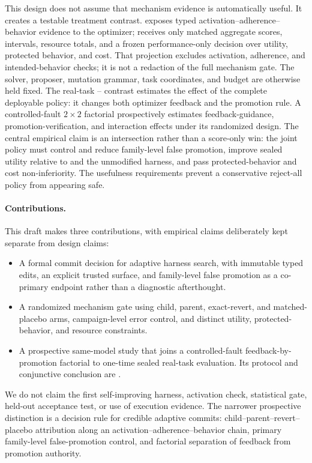 This design does not assume that mechanism evidence is automatically useful.
It creates a testable treatment contrast.  \fullarm{} exposes typed
activation--adherence--behavior evidence to the optimizer; \scorearm{} receives
only matched aggregate scores, intervals, resource totals, and a frozen
performance-only decision over utility, protected behavior, and cost.  That
projection excludes activation, adherence, and intended-behavior checks; it is
not a redaction of the full mechanism gate.  The solver, proposer, mutation
grammar, task coordinates, and budget are otherwise held fixed.  The real-task
\fullarm{}--\scorearm{} contrast estimates the effect of the complete deployable
policy: it changes both optimizer feedback and the promotion rule.  A
controlled-fault \(2\times2\) factorial prospectively estimates feedback-guidance,
promotion-verification, and interaction effects under its randomized design.  The central empirical claim
is an intersection rather than a score-only win: the joint \fullarm{} policy
must control and reduce family-level false promotion, improve sealed utility
relative to \scorearm{} and the unmodified harness, and pass protected-behavior
and cost non-inferiority.  The usefulness requirements prevent a conservative
reject-all policy from appearing safe.

\paragraph{Contributions.}
This draft makes three contributions, with empirical claims deliberately kept
separate from design claims:
\begin{itemize}
  \item A formal commit decision for adaptive harness search, with immutable
  typed edits, an explicit trusted surface, and family-level false promotion as
  a co-primary endpoint rather than a diagnostic afterthought.
  \item A randomized mechanism gate using child, parent, exact-revert, and
  matched-placebo arms, campaign-level error control, and distinct utility,
  protected-behavior, and resource constraints.
  \item A prospective same-model study that joins a controlled-fault
  feedback-by-promotion factorial to one-time sealed real-task evaluation.  Its
  protocol and conjunctive conclusion are
  .
\end{itemize}

We do not claim the first self-improving harness, activation check, statistical
gate, held-out acceptance test, or use of execution evidence.  The narrower
prospective distinction is a decision rule for credible adaptive commits:
child--parent--revert--placebo attribution along an
activation--adherence--behavior chain, primary family-level false-promotion
control, and factorial separation of feedback from promotion authority.
